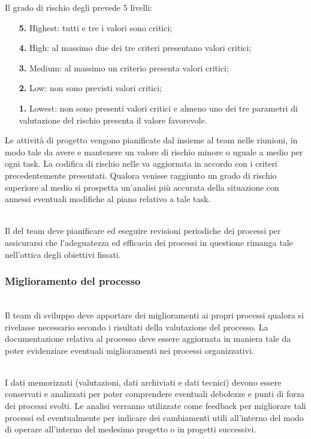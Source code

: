 Il grado di rischio degli  prevede 5 livelli:
\begin{enumerate}
    \item[\textbf{5.}] Highest: tutti e tre i valori sono critici;
    \item[\textbf{4.}] High: al massimo due dei tre criteri presentano valori critici;
    \item[\textbf{3.}] Medium: al massimo un criterio presenta valori critici;
    \item[\textbf{2.}] Low: non sono previsti valori critici;
    \item[\textbf{1.}] Lowest: non sono presenti valori critici e almeno uno dei tre parametri di valutazione del rischio presenta il valore favorevole.
\end{enumerate}

Le attività di progetto vengono pianificate dal \responsabile{} insieme al team nelle riunioni, in modo tale da avere e mantenere un valore di rischio minore o uguale a medio per ogni task. La codifica di rischio nelle  va aggiornata in accordo con i criteri precedentemente presentati. Qualora venisse raggiunto un grado di rischio superiore al medio si prospetta un'analisi più accurata della situazione con annessi eventuali modifiche al piano relativo a tale task.

\leavevmode \\ Il \responsabile{} del team deve pianificare ed eseguire revisioni periodiche dei processi per assicurarsi che l'adeguatezza ed efficacia dei processi in questione rimanga tale nell'ottica degli obiettivi fissati.

\subsubsection{Miglioramento del processo}

\leavevmode \\Il team di sviluppo deve apportare dei miglioramenti ai propri processi qualora si rivelasse necessario secondo i risultati della valutazione del processo. La documentazione relativa al processo deve essere aggiornata in maniera tale da poter evidenziare eventuali miglioramenti nei processi organizzativi.

\leavevmode \\I dati memorizzati (valutazioni, dati archiviati e dati tecnici) devono essere conservati e analizzati per poter comprendere eventuali debolezze e punti di forza dei processi svolti. Le analisi verranno utilizzate come feedback per migliorare tali processi ed eventualmente per indicare dei cambiamenti utili all'interno del modo di operare all'interno del medesimo progetto o in progetti successivi.

